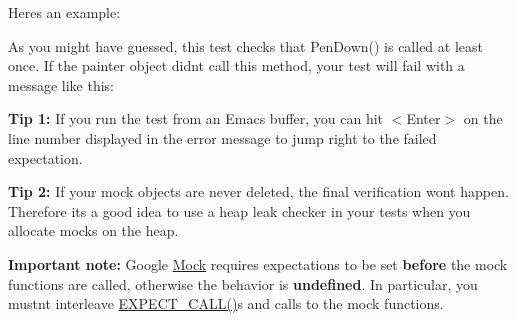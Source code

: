 Here\textquotesingle{}s an example\+:


\begin{DoxyCode}{0}
\DoxyCodeLine{}
\DoxyCodeLine{}
\DoxyCodeLine{}
\DoxyCodeLine{}
\DoxyCodeLine{\}}
\end{DoxyCode}


As you might have guessed, this test checks that {\ttfamily Pen\+Down()} is called at least once. If the {\ttfamily painter} object didn\textquotesingle{}t call this method, your test will fail with a message like this\+:


\begin{DoxyCode}{0}
\end{DoxyCode}


{\bfseries{Tip 1\+:}} If you run the test from an Emacs buffer, you can hit {\ttfamily $<$Enter$>$} on the line number displayed in the error message to jump right to the failed expectation.

{\bfseries{Tip 2\+:}} If your mock objects are never deleted, the final verification won\textquotesingle{}t happen. Therefore it\textquotesingle{}s a good idea to use a heap leak checker in your tests when you allocate mocks on the heap.

{\bfseries{Important note\+:}} Google \mbox{\hyperlink{classMock}{Mock}} requires expectations to be set {\bfseries{before}} the mock functions are called, otherwise the behavior is {\bfseries{undefined}}. In particular, you mustn\textquotesingle{}t interleave {\ttfamily \mbox{\hyperlink{gmock-spec-builders_8h_a535a6156de72c1a2e25a127e38ee5232}{E\+X\+P\+E\+C\+T\+\_\+\+C\+A\+L\+L()}}}s and calls to the mock functions.

